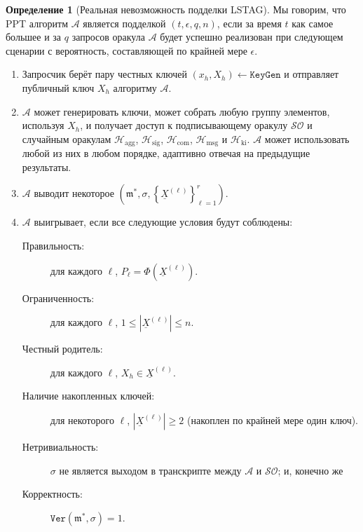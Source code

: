 \documentclass{mrl}
\theoremstyle{definition}
\numberwithin{theorem}{subsection}
\newtheorem{defn}[theorem]{Определение}
\newcommand{\adversary}{\mathcal{A}}
\newcommand{\m}{\mathfrak{m}}
\begin{document}
\begin{defn}[Реальная невозможность подделки LSTAG]\label{game}
Мы говорим, что PPT алгоритм $\adversary$ является подделкой $(t, \epsilon, q,n)$, если за время $t$ как самое большее и за $q$ запросов оракула $\adversary$ будет успешно реализован при следующем сценарии с вероятность, составляющей по крайней мере $\epsilon$.
\begin{enumerate}
\item Запросчик берёт пару честных ключей $(x_h,X_h) \leftarrow \texttt{KeyGen}$ и отправляет публичный ключ $X_h$ алгоритму $\adversary.$

\item $\adversary$ может генерировать ключи, может собрать любую группу элементов, используя $X_h$, и получает доступ к подписывающему оракулу $\mathcal{SO}$ и случайным оракулам $\mathcal{H}_{\text{agg}}$, $\mathcal{H}_{\text{sig}}$, $\mathcal{H}_{\text{com}}$, $\mathcal{H}_{\text{msg}}$ и $\mathcal{H}_{\text{ki}}$. $\adversary$ может использовать любой из них в любом порядке, адаптивно отвечая на предыдущие результаты.

\item $\adversary$ выводит некоторое $(\m^*, \sigma, \left\{\underline{X}^{(\ell)}\right\}_{\ell = 1}^r)$.

\item $\adversary$ выигрывает, если все следующие условия будут соблюдены:

\begin{description}
\item [Правильность:] для каждого $\ell$, $P_\ell = \Phi(\underline{X}^{(\ell)})$.
\item [Ограниченность:] для каждого $\ell$, $1 \leq \left|\underline{X}^{(\ell)}\right| \leq n$.
\item [Честный родитель:] для каждого $\ell$, $X_h \in \underline{X}^{(\ell)}$.
\item [Наличие накопленных ключей: ] для некоторого $\ell$, $\left|\underline{X}^{(\ell)}\right| \geq 2$ (накоплен по крайней мере один ключ).
\item [Нетривиальность:] $\sigma$ не является выходом в транскрипте между $\mathcal{A}$ и $\mathcal{SO}$; и, конечно же
\item [Корректность:] $\texttt{Ver}(\m^*, \sigma) = 1$.
\end{description}

\end{enumerate}

\end{defn}
\end{document}
